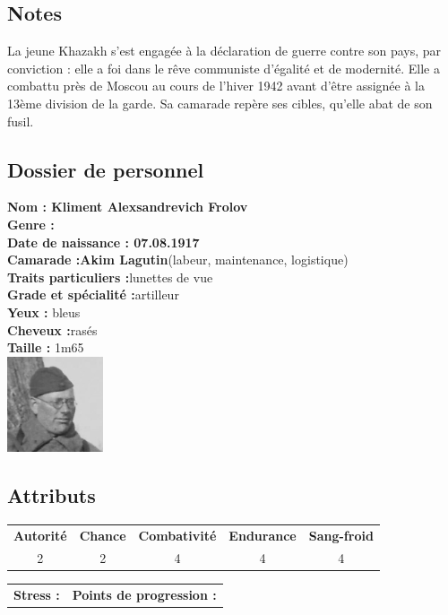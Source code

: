 \documentclass{report}
\begin{document}
\subsection*{Notes}
La jeune Khazakh s'est engagée à la déclaration de guerre contre son pays, par conviction : elle a foi dans le rêve communiste d'égalité et de modernité. Elle a combattu près de Moscou au cours de l'hiver 1942 avant d'être assignée à la 13ème division de la garde. Sa camarade repère ses cibles, qu'elle abat de son fusil.
\newpage
\ttfamily
\begin{center}
\section*{Dossier de personnel}
\begin{multicols}{3}
\textbf{Nom : Kliment Alexsandrevich Frolov}\\
\textbf{Genre :}\\\textbf{Date de naissance : 07.08.1917}\\
\textbf{Camarade :Akim Lagutin}(labeur, maintenance, logistique)\\
\textbf{Traits particuliers :}lunettes de vue\\
\columnbreak
\textbf{Grade et spécialité :}artilleur \\
\textbf{Yeux :} bleus\\
\textbf{Cheveux :}rasés\\
\textbf{Taille : }1m65\\
\columnbreak
\includegraphics[height=80pt]{Kliment.jpg}
\end{multicols}
\end{center}
\noindent\makebox[\linewidth]{\rule{\textwidth}{0.4pt}}
\subsection*{Attributs}
\begin{center}
    \begin{tabular}{c|c|c|c|c}
        \textbf{Autorité} & \textbf{Chance} & \textbf{Combativité} & \textbf{Endurance} & \textbf{Sang-froid} \\
         2&2 &4 &4 &4\\

    \end{tabular}
\end{center}
\begin{tabular}{m{} m{}}
     \textbf{Stress :} & \textbf{Points de progression :}
\end{tabular}\\
\noindent\makebox[\linewidth]{\rule{\textwidth}{0.4pt}}
\end{document}
